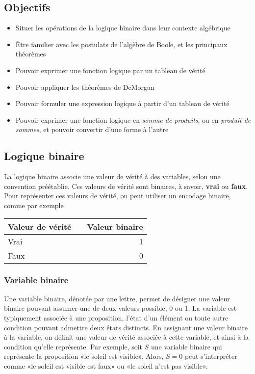 \documentclass[11pt]{article}
\begin{document}
\subsection{Objectifs}
\label{sec:org047664c}
\begin{itemize}
\item Situer les opérations de la logique binaire dans leur contexte algébrique
\item Être familier avec les postulats de l'algèbre de Boole, et les
principaux théorèmes
\item Pouvoir exprimer une fonction logique par un tableau de vérité
\item Pouvoir appliquer les théorèmes de DeMorgan
\item Pouvoir formuler une expression logique à partir d'un tableau de vérité
\item Pouvoir exprimer une fonction logique en \emph{somme de produits}, ou en
\emph{produit de sommes}, et pouvoir convertir d'une forme à l'autre
\end{itemize}

\subsection{Logique binaire}
\label{sec:org011a5ae}

La logique binaire associe une valeur de vérité à des variables, selon
une convention préétablie. Ces valeurs de vérité sont binaires, à
savoir, \textbf{vrai} ou \textbf{faux}. Pour représenter ces valeurs de vérité, on
peut utiliser un encodage binaire, comme par exemple

\begin{center}
\begin{tabular}{llr}
Valeur de vérité &  & Valeur binaire\\
\hline
Vrai &  & 1\\
Faux &  & 0\\
\end{tabular}
\end{center}


\subsubsection{Variable binaire}
\label{sec:org4956d91}

Une variable binaire, dénotée par une lettre, permet de désigner une
valeur binaire pouvant assumer une de deux valeurs possible, 0
ou 1. La variable est typiquement associée à une proposition, l'état
d'un élément ou toute autre condition pouvant admettre deux états
distincts. En assignant une valeur binaire à la variable, on définit
une valeur de vérité associée à cette variable, et ainsi à la
condition qu'elle représente. Par exemple, soit \(S\) une variable
binaire qui représente la proposition «le soleil est visible». Alors,
\(S=0\) peut s'interpréter comme «le soleil est visible est faux» ou
«le soleil n'est pas visible».
\end{document}
